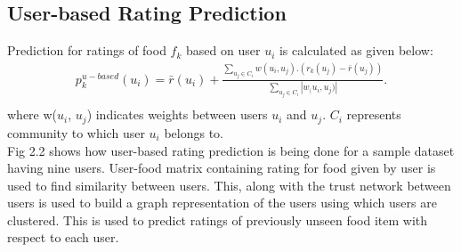 \subsection{User-based Rating Prediction}
Prediction for ratings of food $f_k$ based on user $u_i$ is calculated as given below\cite*{9775081}:
\begin{align*} p_{k}^{u-based}\left({u_{i}}\right)\!=\!\bar {r}\left({u_{i}}\right)+\frac {\sum _{u_{j}\in C_{i}}{w(u_{i},u_{j}).\left({r_{k}\left({u_{j}}\right)\!-\!\bar {r}\left({u_{j}}\right)}\right)}}{\sum _{u_{j}\in C_{i}}\left |{w_{(}u_{i},u_{j})}\right |}. \\\tag{4}\end{align*}
where w($u_i$, $u_j$) indicates weights between users $u_i$ and $u_j$. $C_i$ represents community to which user $u_i$ belongs to.
\\
Fig 2.2\cite*{9775081} shows how user-based rating prediction is being done for a sample dataset having nine users\cite*{9775081}. User-food matrix containing rating for food given by user is used to find similarity between users. This, along with the trust network between users is used to build a graph representation of the users using which users are clustered. This is used to predict ratings of previously unseen food item with respect to each user.
